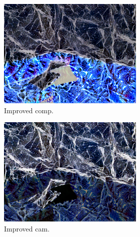 \begin{figure}[]
\begin{subfigure}{\textwidth}
        \begin{subfigure}{0.24\textwidth}
            \centering
            \includegraphics[width=\textwidth]{images/04-experiment02/sofa/marble/improved_im.jpg}
            \caption*{Improved comp.}
        \end{subfigure}
        \hfill
        \begin{subfigure}{0.24\textwidth}
            \centering
            \includegraphics[width=\textwidth]{images/04-experiment02/sofa/marble/improved_proj.jpg}
            \caption*{Improved cam.}
        \end{subfigure}
        \hfill
        \begin{subfigure}{0.24\textwidth}
            \centering

\end{subfigure}
\end{subfigure}
\end{figure}
